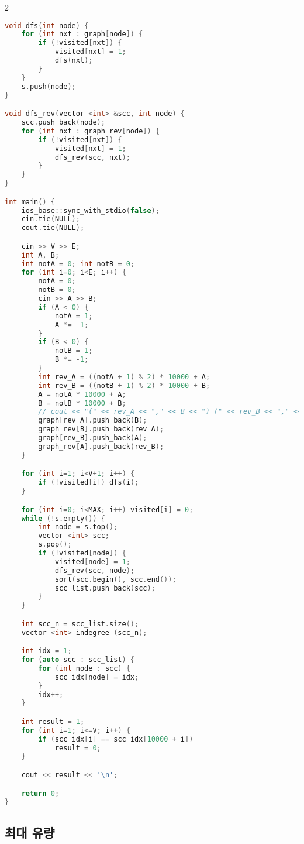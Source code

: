 \documentclass[]{article}
\begin{document}
\begin{multicols*}{2}
\begin{lstlisting}[language=c++]
void dfs(int node) {
    for (int nxt : graph[node]) {
        if (!visited[nxt]) {
            visited[nxt] = 1;
            dfs(nxt);
        }
    }
    s.push(node);
}

void dfs_rev(vector <int> &scc, int node) {
    scc.push_back(node);
    for (int nxt : graph_rev[node]) {
        if (!visited[nxt]) {
            visited[nxt] = 1;
            dfs_rev(scc, nxt);
        }
    }
}

int main() {
    ios_base::sync_with_stdio(false);
    cin.tie(NULL);
    cout.tie(NULL);

    cin >> V >> E;
    int A, B;
    int notA = 0; int notB = 0;
    for (int i=0; i<E; i++) {
        notA = 0;
        notB = 0;
        cin >> A >> B;
        if (A < 0) {
            notA = 1;
            A *= -1;
        }
        if (B < 0) {
            notB = 1;
            B *= -1;
        }
        int rev_A = ((notA + 1) % 2) * 10000 + A;
        int rev_B = ((notB + 1) % 2) * 10000 + B;
        A = notA * 10000 + A;
        B = notB * 10000 + B;
        // cout << "(" << rev_A << "," << B << ") (" << rev_B << "," << A << ")\n";
        graph[rev_A].push_back(B);
        graph_rev[B].push_back(rev_A);
        graph[rev_B].push_back(A);
        graph_rev[A].push_back(rev_B);
    }

    for (int i=1; i<V+1; i++) {
        if (!visited[i]) dfs(i);
    }

    for (int i=0; i<MAX; i++) visited[i] = 0;
    while (!s.empty()) {
        int node = s.top();
        vector <int> scc;
        s.pop();
        if (!visited[node]) {
            visited[node] = 1;
            dfs_rev(scc, node);
            sort(scc.begin(), scc.end());
            scc_list.push_back(scc);
        }
    }

    int scc_n = scc_list.size();
    vector <int> indegree (scc_n);

    int idx = 1;
    for (auto scc : scc_list) {
        for (int node : scc) {
            scc_idx[node] = idx;
        }
        idx++;
    }

    int result = 1;
    for (int i=1; i<=V; i++) {
        if (scc_idx[i] == scc_idx[10000 + i])
            result = 0;
    }

    cout << result << '\n';

    return 0;
}
\end{lstlisting}
\columnbreak
\subsection{최대 유량}

\end{multicols*}
\end{document}
